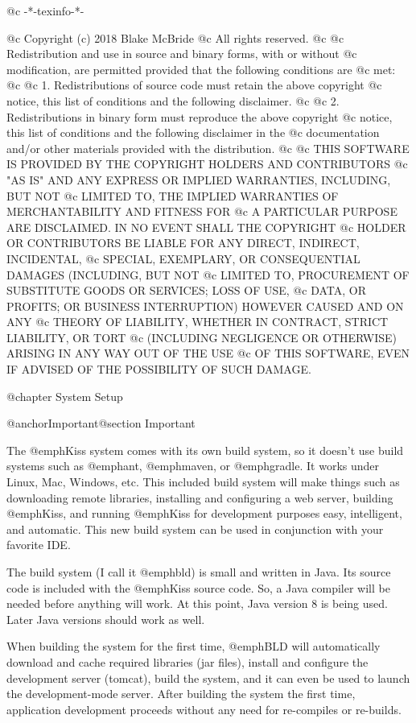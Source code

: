 @c -*-texinfo-*-

@c  Copyright (c) 2018 Blake McBride
@c  All rights reserved.
@c
@c  Redistribution and use in source and binary forms, with or without
@c  modification, are permitted provided that the following conditions are
@c  met:
@c
@c  1. Redistributions of source code must retain the above copyright
@c  notice, this list of conditions and the following disclaimer.
@c
@c  2. Redistributions in binary form must reproduce the above copyright
@c  notice, this list of conditions and the following disclaimer in the
@c  documentation and/or other materials provided with the distribution.
@c
@c  THIS SOFTWARE IS PROVIDED BY THE COPYRIGHT HOLDERS AND CONTRIBUTORS
@c  "AS IS" AND ANY EXPRESS OR IMPLIED WARRANTIES, INCLUDING, BUT NOT
@c  LIMITED TO, THE IMPLIED WARRANTIES OF MERCHANTABILITY AND FITNESS FOR
@c  A PARTICULAR PURPOSE ARE DISCLAIMED. IN NO EVENT SHALL THE COPYRIGHT
@c  HOLDER OR CONTRIBUTORS BE LIABLE FOR ANY DIRECT, INDIRECT, INCIDENTAL,
@c  SPECIAL, EXEMPLARY, OR CONSEQUENTIAL DAMAGES (INCLUDING, BUT NOT
@c  LIMITED TO, PROCUREMENT OF SUBSTITUTE GOODS OR SERVICES; LOSS OF USE,
@c  DATA, OR PROFITS; OR BUSINESS INTERRUPTION) HOWEVER CAUSED AND ON ANY
@c  THEORY OF LIABILITY, WHETHER IN CONTRACT, STRICT LIABILITY, OR TORT
@c  (INCLUDING NEGLIGENCE OR OTHERWISE) ARISING IN ANY WAY OUT OF THE USE
@c  OF THIS SOFTWARE, EVEN IF ADVISED OF THE POSSIBILITY OF SUCH DAMAGE.


@chapter System Setup

@anchor{Important}@section Important

The @emph{Kiss} system comes with its own build system, so it doesn't
use build systems such as @emph{ant}, @emph{maven}, or @emph{gradle}.
It works under Linux, Mac, Windows, etc. This included build system
will make things such as downloading remote libraries, installing and
configuring a web server, building @emph{Kiss}, and running
@emph{Kiss} for development purposes easy, intelligent, and automatic.
This new build system can be used in conjunction with your favorite IDE.

The build system (I call it @emph{bld}) is small and
written in Java.  Its source code is included with the @emph{Kiss}
source code.  So, a Java compiler will be needed before anything will
work.  At this point, Java version 8 is being used.  Later Java
versions should work as well.

When building the system for the first time, @emph{BLD} will
automatically download and cache required libraries (jar files), install and
configure the development server (tomcat), build the system, and it
can even be used to launch the development-mode server.  After building
the system the first time, application development proceeds without
any need for re-compiles or re-builds.

